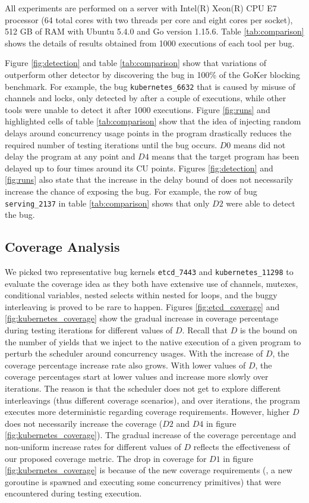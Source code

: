 All experiments are performed on a server with Intel(R) Xeon(R) CPU E7 processor (64 total cores with two threads per core and eight cores per socket), 512 GB of RAM with Ubuntu 5.4.0 and Go version 1.15.6.
%
Table \ref{tab:comparison} shows the details of results obtained from 1000 executions of each tool per bug.
%

%


%
Figure \ref{fig:detection} and table \ref{tab:comparison} show that variations of \goat outperform other detector by discovering the bug in 100\% of the GoKer blocking benchmark.
%
For example, the bug \texttt{kubernetes\_6632} that is caused by misuse of channels and locks, only detected by \goat after a couple of executions, while other tools were unable to detect it after 1000 executions.
%
Figure \ref{fig:runs} and highlighted cells of table \ref{tab:comparison} show that the idea of injecting random delays around concurrency usage points in the program drastically reduces the required number of testing iterations until the bug occurs.
%
$D0$ means \goat did not delay the program at any point and $D4$ means that the target program has been delayed up to four times around its CU points.
%
Figures \ref{fig:detection} and \ref{fig:runs} also state that the increase in the delay bound of \goat does not necessarily increase the chance of exposing the bug.
%
For example, the row of bug \texttt{serving\_2137} in table \ref{tab:comparison} shows that only \goat $D2$ were able to detect the bug.




\subsection{Coverage Analysis}
We picked two representative bug kernels \texttt{etcd\_7443} and \texttt{kubernetes\_11298} to evaluate the coverage idea as they both have extensive use of channels, mutexes, conditional variables, nested selects within nested for loops, and the buggy interleaving is proved to be rare to happen.
%
Figures \ref{fig:etcd_coverage} and \ref{fig:kubernetes_coverage} show the gradual increase in coverage percentage during testing iterations for different values of $D$.
%
Recall that $D$ is the bound on the number of yields that we inject to the native execution of a given program to perturb the scheduler around concurrency usages.
%
With the increase of $D$, the coverage percentage increase rate also grows.
%
With lower values of $D$, the coverage percentages start at lower values and increase more slowly over iterations.
%
The reason is that the scheduler does not get to explore different interleavings (thus different coverage scenarios), and over iterations, the program executes more deterministic regarding coverage requirements.
%
However, higher $D$ does not necessarily increase the coverage ($D2$ and $D4$ in figure \ref{fig:kubernetes_coverage}).
%
The gradual increase of the coverage percentage and non-uniform increase rates for different values of $D$ reflects the effectiveness of our proposed coverage metric.
%
The drop in coverage for $D1$ in figure \ref{fig:kubernetes_coverage} is because of the new coverage requirements (\eg, a new goroutine is spawned and executing some concurrency primitives) that were encountered during testing execution.
%
